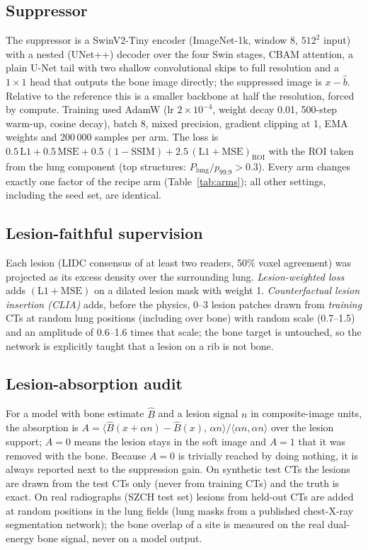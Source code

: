\subsection{Suppressor}
The suppressor is a SwinV2-Tiny encoder (ImageNet-1k, window 8, $512^2$ input) with a nested (UNet++) decoder over the four Swin stages, CBAM attention, a plain
U-Net tail with two shallow convolutional skips to full resolution and a $1\times1$ head that outputs the bone image directly; the suppressed image is
$x-\hat b$. Relative to the reference this is a smaller backbone at half the resolution, forced by compute. Training used AdamW (lr $2\times10^{-4}$,
weight decay 0.01, 500-step warm-up, cosine decay), batch 8, mixed precision, gradient clipping at 1, EMA weights and 200\,000 samples per arm.
The loss is $0.5\,\mathrm{L1}+0.5\,\mathrm{MSE}+0.5\,(1-\mathrm{SSIM})+2.5\,(\mathrm{L1}+\mathrm{MSE})_{\mathrm{ROI}}$ with the ROI taken from the lung component
(top structures: $P_{\mathrm{lung}}/p_{99.9}>0.3$). Every arm changes exactly one factor of the recipe arm (Table~\ref{tab:arms}); all other settings,
including the seed set, are identical.

\subsection{Lesion-faithful supervision}
Each lesion (LIDC consensus of at least two readers, 50\% voxel agreement) was projected as its excess density over the surrounding lung.
\emph{Lesion-weighted loss} adds $(\mathrm{L1}+\mathrm{MSE})$ on a dilated lesion mask with weight 1. \emph{Counterfactual lesion insertion (CLIA)}
adds, before the physics, 0--3 lesion patches drawn from \emph{training} CTs at random lung positions (including over bone) with random scale
(0.7--1.5) and an amplitude of 0.6--1.6 times that scale; the bone target is untouched, so the network is explicitly taught that a lesion on a rib is not bone.

\subsection{Lesion-absorption audit}
For a model with bone estimate $\hat B$ and a lesion signal $n$ in composite-image units, the absorption is
$A=\langle \hat B(x+\alpha n)-\hat B(x),\,\alpha n\rangle/\langle\alpha n,\alpha n\rangle$ over the lesion support;
$A=0$ means the lesion stays in the soft image and $A=1$ that it was removed with the bone. Because $A=0$ is trivially reached by doing nothing,
it is always reported next to the suppression gain. On synthetic test CTs the lesions are drawn from the test CTs only (never from training CTs) and the truth is exact.
On real radiographs (SZCH test set) lesions from held-out CTs are added at random positions in the lung fields (lung masks from a published chest-X-ray
segmentation network); the bone overlap of a site is measured on the real dual-energy bone signal, never on a model output.

